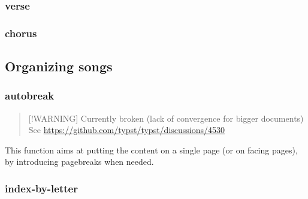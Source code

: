 \subsubsection{verse}\label{verse}

\begin{Shaded}
\begin{Highlighting}[]
\end{Highlighting}
\end{Shaded}

\subsubsection{chorus}\label{chorus}

\begin{Shaded}
\begin{Highlighting}[]
\end{Highlighting}
\end{Shaded}

\subsection{Organizing songs}\label{organizing-songs}

\subsubsection{autobreak}\label{autobreak}

\begin{quote}
{[}!WARNING{]} Currently broken (lack of convergence for bigger
documents) See \url{https://github.com/typst/typst/discussions/4530}
\end{quote}

This function aims at putting the content on a single page (or on facing
pages), by introducing pagebreaks when needed.

\begin{Shaded}
\begin{Highlighting}[]
\end{Highlighting}
\end{Shaded}

\subsubsection{index-by-letter}\label{index-by-letter}

\begin{Shaded}
\begin{Highlighting}[]
\end{Highlighting}
\end{Shaded}


